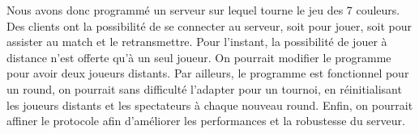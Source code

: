 \documentclass[a4paper]{article}
\begin{document}
Nous avons donc programmé un serveur sur lequel tourne le jeu des 7 couleurs. 
Des clients ont la possibilité de se connecter au serveur, soit pour jouer, 
soit pour assister au match et le retransmettre. Pour l'instant, la possibilité 
de jouer à distance n'est offerte qu'à un seul joueur. On pourrait modifier le 
programme pour avoir deux joueurs distants. Par ailleurs, le programme est 
fonctionnel pour un round, on pourrait sans difficulté l'adapter pour un 
tournoi, en réinitialisant les joueurs distants et les spectateurs à chaque 
nouveau round. Enfin, on pourrait affiner le protocole afin d'améliorer les 
performances et la robustesse du serveur.


 

\end{document}
